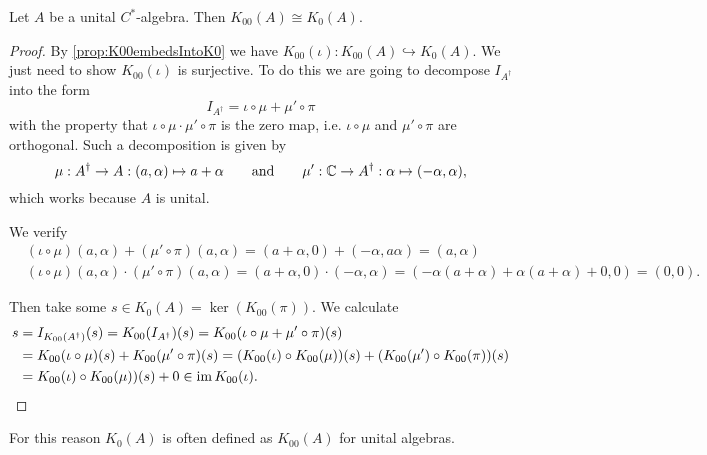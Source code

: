 \begin{proposition}
Let $A$ be a unital $C^*$-algebra. Then $K_{00}(A) \cong K_0(A)$.
\end{proposition}
\begin{proof}
By \ref{prop:K00embedsIntoK0} we have $K_{00}(\iota): K_{00}(A) \hookrightarrow K_{0}(A)$. We just need to show $K_{00}(\iota)$ is surjective. To do this we are going to decompose $I_{A^\dagger}$ into the form
\[ I_{A^\dagger} = \iota\circ \mu + \mu'\circ \pi \]
with the property that $\iota\circ \mu \cdot \mu'\circ \pi$ is the zero map, i.e. $\iota\circ \mu$ and $\mu'\circ \pi$ are orthogonal. Such a decomposition is given by
\[ \mu: A^\dagger \to A: (a,\alpha) \mapsto a+\alpha \qquad \text{and}\qquad \mu': \mathbb{C} \to A^\dagger: \alpha \mapsto (-\alpha, \alpha),\]
which works because $A$ is unital.

We verify
\begin{align*}
&(\iota\circ \mu)(a,\alpha) + (\mu'\circ \pi)(a,\alpha) = (a+\alpha, 0) + (-\alpha, a\alpha) = (a,\alpha) \\
&(\iota\circ \mu)(a,\alpha) \cdot (\mu'\circ \pi)(a,\alpha) = (a+\alpha,0) \cdot (-\alpha, \alpha) = (-\alpha(a+\alpha) + \alpha(a+\alpha) + 0,0) = (0,0).
\end{align*}

Then take some $s\in K_0(A) = \ker(K_{00}(\pi))$. We calculate
\begin{align*}
s &= I_{K_{00}(A^\dagger)}(s) = K_{00}(I_{A^\dagger})(s) = K_{00}(\iota\circ \mu + \mu'\circ \pi)(s) \\
&= K_{00}(\iota\circ \mu)(s) + K_{00}(\mu'\circ \pi)(s) = (K_{00}(\iota)\circ K_{00}(\mu))(s) + (K_{00}(\mu')\circ K_{00}(\pi))(s) \\
&= K_{00}(\iota)\circ K_{00}(\mu))(s) + 0 \in \operatorname{im} K_{00}(\iota).
\end{align*}
\end{proof}
For this reason $K_0(A)$ is often defined as $K_{00}(A)$ for unital algebras.

